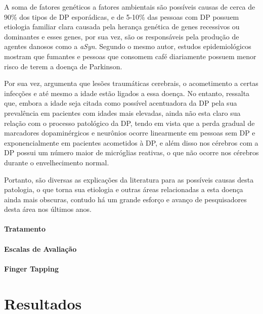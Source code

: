 \documentclass[
	12pt,				%
	openany,			%
	oneside,			%
	a4paper,			%
	english,			%
	french,				%
	spanish,			%
	brazil				%
	]{abntex2}
\begin{document}
A soma de fatores genéticos a fatores ambientais são possíveis causas de cerca de 90\% dos tipos de DP esporádicas, e de 5-10\% das pessoas com DP possuem etiologia familiar clara causada pela herança genética de genes recessivos ou dominantes e esses genes, por sua vez, são os responsáveis pela produção de agentes danosos como a \textit{aSyn}\cite{rana2011}. Segundo o mesmo autor, estudos epidemiológicos mostram que fumantes e pessoas que consomem café diariamente possuem menor risco de terem a doença de Parkinson.	

Por sua vez,  argumenta que lesões traumáticas cerebrais, o acometimento a certas infecções e até mesmo a idade estão ligados a essa doença. No entanto,  ressalta que, embora a idade seja citada como possível acentuadora da DP pela sua prevalência em pacientes com idades mais elevadas, ainda não esta claro sua relação com o processo patológico da DP, tendo em vista que a perda gradual de marcadores dopaminérgicos e neurônios ocorre linearmente em pessoas sem DP e exponencialmente em pacientes acometidos à DP, e além disso nos cérebros com a DP possui um número maior de micróglias reativas, o que não ocorre nos cérebros durante o envelhecimento normal.

Portanto, são diversas as explicações da literatura para as possíveis causas desta patologia, o que torna sua etiologia e outras áreas relacionadas a esta doença ainda mais obscuras, contudo há um grande esforço e avanço de pesquisadores desta área nos últimos anos.


\subsection{Tratamento}




\subsection{Escalas de Avaliação}

\subsection{Finger Tapping}

\part{Resultados}
\end{document}
